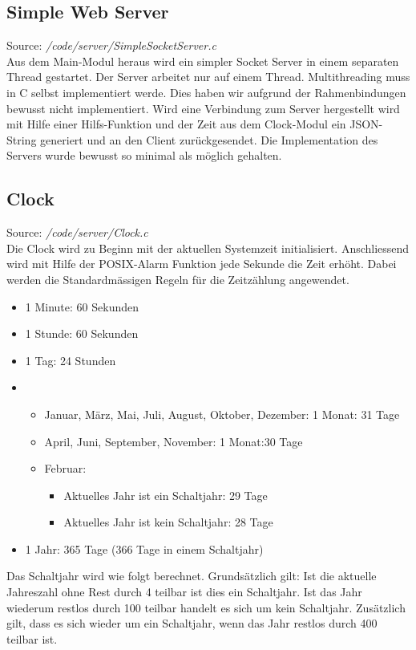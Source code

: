 \subsection{Simple Web Server}
Source: \textit{/code/server/SimpleSocketServer.c}\\
Aus dem Main-Modul heraus wird ein simpler Socket Server in einem separaten Thread gestartet. Der Server arbeitet nur auf einem Thread. Multithreading muss in C selbst implementiert werde. Dies haben wir aufgrund der Rahmenbindungen bewusst nicht implementiert. Wird eine Verbindung zum Server hergestellt wird mit Hilfe einer Hilfs-Funktion und der Zeit aus dem Clock-Modul ein JSON-String generiert und an den Client zurückgesendet. Die Implementation des Servers wurde bewusst so minimal als möglich gehalten.

\subsection{Clock}
Source: \textit{/code/server/Clock.c}\\
Die Clock wird zu Beginn mit der aktuellen Systemzeit initialisiert. Anschliessend wird mit Hilfe der POSIX-Alarm Funktion jede Sekunde die Zeit erhöht. Dabei werden die Standardmässigen Regeln für die Zeitzählung angewendet.
\begin{itemize}
\item 1 Minute: 60 Sekunden
\item 1 Stunde: 60 Sekunden
\item 1 Tag: 24 Stunden
\item 
\begin{itemize}
\item Januar, März, Mai, Juli, August, Oktober, Dezember: 1 Monat: 31 Tage 
\item April, Juni, September, November: 1 Monat:30 Tage
\item Februar:
\begin{itemize}
\item Aktuelles Jahr ist ein Schaltjahr: 29 Tage 
\item Aktuelles Jahr ist kein Schaltjahr: 28 Tage
\end{itemize}
\end{itemize}
\item 1 Jahr: 365 Tage (366 Tage in einem Schaltjahr)
\end{itemize}

Das Schaltjahr wird wie folgt berechnet. Grundsätzlich gilt: Ist die aktuelle Jahreszahl ohne Rest durch 4 teilbar ist dies ein Schaltjahr. Ist das Jahr wiederum restlos durch 100 teilbar handelt es sich um kein Schaltjahr. Zusätzlich gilt, dass es sich wieder um ein Schaltjahr, wenn das Jahr restlos durch 400 teilbar ist.

